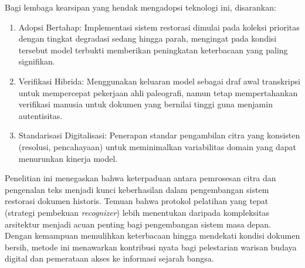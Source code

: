 Bagi lembaga kearsipan yang hendak mengadopsi teknologi ini, disarankan:
\begin{enumerate}[leftmargin=1.5em, labelsep=0.5em, itemindent=0pt, noitemsep, topsep=0pt, partopsep=0pt]
  \item Adopsi Bertahap: Implementasi sistem restorasi dimulai pada koleksi prioritas dengan tingkat degradasi sedang hingga parah, mengingat pada kondisi tersebut model terbukti memberikan peningkatan keterbacaan yang paling signifikan.
  \item Verifikasi Hibrida: Menggunakan keluaran model sebagai draf awal transkripsi untuk mempercepat pekerjaan ahli paleografi, namun tetap mempertahankan verifikasi manusia untuk dokumen yang bernilai tinggi guna menjamin autentisitas.
  \item Standarisasi Digitalisasi: Penerapan standar pengambilan citra yang konsisten (resolusi, pencahayaan) untuk meminimalkan variabilitas domain yang dapat menurunkan kinerja model.
\end{enumerate}



Penelitian ini menegaskan bahwa keterpaduan antara pemrosesan citra dan pengenalan teks menjadi kunci keberhasilan dalam pengembangan sistem restorasi dokumen historis. Temuan bahwa protokol pelatihan yang tepat (strategi pembekuan \textit{recognizer}) lebih menentukan daripada kompleksitas arsitektur menjadi acuan penting bagi pengembangan sistem masa depan. Dengan kemampuan memulihkan keterbacaan hingga mendekati kondisi dokumen bersih, metode ini menawarkan kontribusi nyata bagi pelestarian warisan budaya digital dan pemerataan akses ke informasi sejarah bangsa.

